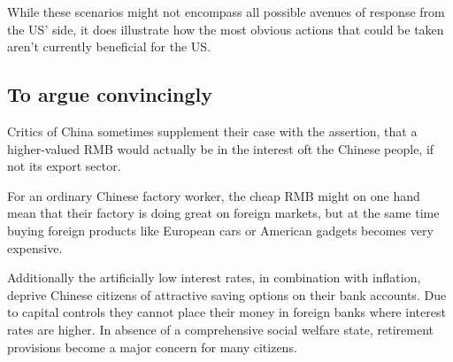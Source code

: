 While these scenarios might not encompass all possible avenues of 
response from the US' side, it does illustrate how the most obvious 
actions that could be taken aren't currently beneficial for the US.


\subsection{To argue convincingly}



Critics of China sometimes supplement their case with the assertion, that a higher-valued RMB would actually be in the interest oft the Chinese people, if not its export sector.

For an ordinary Chinese factory worker, the cheap RMB might on one hand 
mean that their factory is doing great on foreign markets, but at the 
same time buying foreign products like European cars or American gadgets 
becomes very expensive. 

Additionally the artificially low interest rates, in combination with 
inflation, deprive Chinese citizens of attractive saving options on 
their bank accounts. Due to capital controls they cannot place their 
money in foreign banks where interest rates are higher. In absence of a 
comprehensive social welfare state, retirement provisions become a major 
concern for many citizens.

